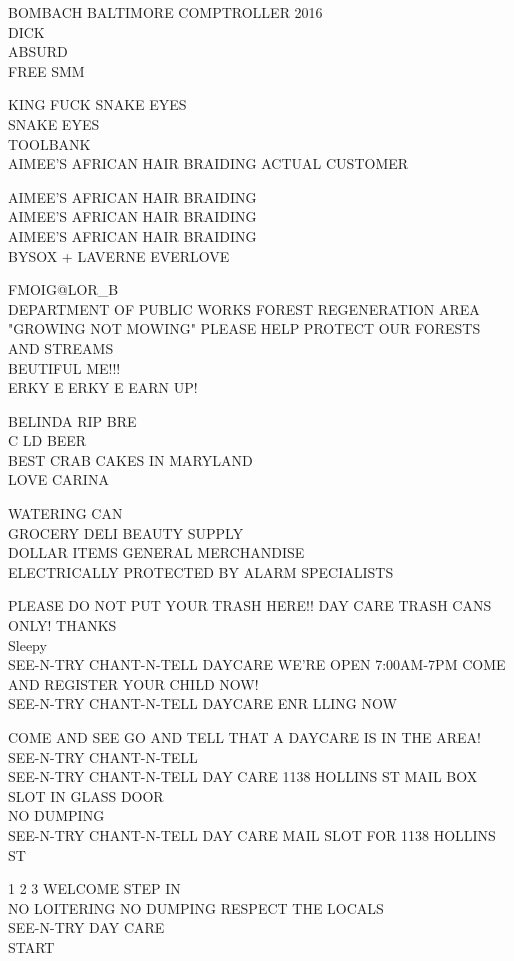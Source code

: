 \documentclass[10pt,letterpaper]{article}
\begin{document}
BOMBACH BALTIMORE COMPTROLLER 2016\\
DICK\\
ABSURD\\
FREE SMM

KING FUCK SNAKE EYES\\
SNAKE EYES\\
TOOLBANK\\
AIMEE'S AFRICAN HAIR BRAIDING ACTUAL CUSTOMER

AIMEE'S AFRICAN HAIR BRAIDING\\
AIMEE'S AFRICAN HAIR BRAIDING\\
AIMEE'S AFRICAN HAIR BRAIDING\\
BYSOX + LAVERNE EVERLOVE

FMOIG@LOR\_B\\
DEPARTMENT OF PUBLIC WORKS FOREST REGENERATION AREA "GROWING NOT MOWING" PLEASE HELP PROTECT OUR FORESTS AND STREAMS\\
BEUTIFUL ME!!!\\
ERKY E ERKY E EARN UP!

BELINDA RIP BRE\\
C LD BEER\\
BEST CRAB CAKES IN MARYLAND\\
LOVE CARINA

WATERING CAN\\
GROCERY DELI BEAUTY SUPPLY\\
DOLLAR ITEMS GENERAL MERCHANDISE\\
ELECTRICALLY PROTECTED BY ALARM SPECIALISTS

PLEASE DO NOT PUT YOUR TRASH HERE!! DAY CARE TRASH CANS ONLY!  THANKS\\
Sleepy\\
SEE{-}N{-}TRY CHANT{-}N{-}TELL DAYCARE WE'RE OPEN 7:00AM{-}7PM COME AND REGISTER YOUR CHILD NOW!\\
SEE{-}N{-}TRY CHANT{-}N{-}TELL DAYCARE ENR LLING NOW

COME AND SEE GO AND TELL THAT A DAYCARE IS IN THE AREA!  SEE{-}N{-}TRY CHANT{-}N{-}TELL\\
SEE{-}N{-}TRY CHANT{-}N{-}TELL DAY CARE 1138 HOLLINS ST MAIL BOX SLOT IN GLASS DOOR\\
NO DUMPING\\
SEE{-}N{-}TRY CHANT{-}N{-}TELL DAY CARE MAIL SLOT FOR 1138 HOLLINS ST

1 2 3 WELCOME STEP IN\\
NO LOITERING NO DUMPING RESPECT THE LOCALS\\
SEE{-}N{-}TRY DAY CARE\\
START
\end{document}
